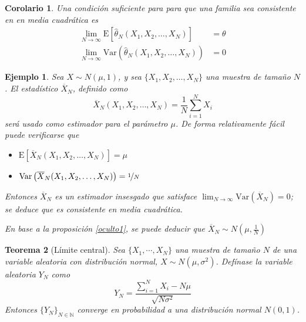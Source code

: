 \documentclass[12pt,letterpaper]{book}
\newtheorem{teorema}{Teorema}[chapter]
\newtheorem{corolario}[teorema]{Corolario}
\newtheorem{ejemplo}{Ejemplo}[chapter]
\newcommand{\N}{\mathbb{N}}
\newcommand{\E}[1]{\mathrm{E}\left[ #1 \right]}
\newcommand{\Var}[1]{\mathrm{Var}\left( #1 \right)}
\begin{document}
\begin{corolario}
Una condición suficiente para para que una familia sea consistente en en media cuadrática es
\begin{align}
\lim_{N\rightarrow\infty} \E{\widehat{\theta}_N(X_1,X_2,\dots,X_N)} &= \theta \\
\lim_{N\rightarrow\infty} \Var{\widehat{\theta}_N(X_1,X_2,\dots,X_N)} &= 0
\end{align}
\end{corolario}

\begin{ejemplo}
Sea $X\sim N(\mu,1)$, y sea $\{ X_1, X_2, \dots, X_N \}$ una muestra de tamaño $N$. El estadístico $\overline{X}_N$, definido como
\begin{equation}
\overline{X}_N (X_1,X_2,\dots,X_N) = \frac{1}{N} \sum_{i=1}^N X_i
\end{equation}
será usado como estimador para el parámetro $\mu$.
%
De forma relativamente fácil puede verificarse que
\begin{itemize}
\item $\E{\overline{X}_N (X_1,X_2,\dots,X_N)} = \mu$
\item $\Var{\overline{X}_N (X_1,X_2,\dots,X_N)} = \nicefrac{1}{N}$
\end{itemize}

Entonces $\overline{X}_N$ es un estimador insesgado que satisface $\lim_{N\rightarrow\infty} \Var{\overline{X}_N}=0$; se deduce que es consistente en media cuadrática.

En base a la proposición \ref{oculto1}, se puede deducir que $\overline{X}_N \sim N\left(\mu,\frac{1}{N}\right)$
\end{ejemplo}

\begin{teorema}[Límite central]
Sea $\{ X_1, \cdots, X_N\}$ una muestra de tamaño $N$ de una variable aleatoria con distribución normal, $X\sim N(\mu,\sigma^{2})$. Defínase la variable aleatoria $Y_N$ como
\begin{equation}
Y_N = \frac{\sum_{i=1}^{N}X_i - N \mu}{\sqrt{N \sigma^{2}}}
\end{equation}
Entonces $\{ Y_N \}_{N \in \N}$ converge en probabilidad a una distribución normal $N(0,1)$.
\end{teorema}

\end{document}
